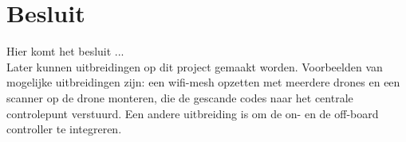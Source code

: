 \chapter*{Besluit}
Hier komt het besluit ...\\

Later kunnen uitbreidingen op dit project gemaakt worden.
Voorbeelden van mogelijke uitbreidingen zijn: een wifi-mesh opzetten met meerdere 	drones en een scanner op de drone monteren, die de gescande codes naar het centrale controlepunt verstuurd.
Een andere uitbreiding is om de on- en de off-board controller te integreren.